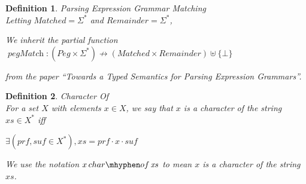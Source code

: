 \documentclass[11pt]{article}
\newcommand{\setPeg}{\mathit{Peg}}
\newcommand{\funPegMatch}{\operatorname{\mathit{pegMatch}}}
\newtheorem{definition}{Definition}
\begin{document}
\begin{definition} Parsing Expression Grammar Matching \\
  Letting $\mathit{Matched} = \Sigma^*$ and $\mathit{Remainder} = \Sigma^*$,

  \noindent We inherit the partial function
  $\funPegMatch : (\setPeg \times \Sigma^*) \nrightarrow (\mathit{Matched} \times \mathit{Remainder}) \uplus \{\bot\}$

  \noindent from the paper
  ``Towards a Typed Semantics for Parsing Expression Grammars''.
\end{definition}

\begin{definition} Character Of \\
  For a set $X$ with elements $x \in X$, we say that
  $x$ is a character of the string $\mathit{xs} \in X^*$ iff

  \noindent
  $\exists (\mathit{prf}, \mathit{suf} \in X^*),
     \mathit{xs} = \mathit{prf} \cdot x \cdot \mathit{suf}$

  \noindent We use the notation $x \mathop{char{\mhyphen}of} \mathit{xs}$
  to mean $x$ is a character of the string $xs$.
\end{definition}
\end{document}
